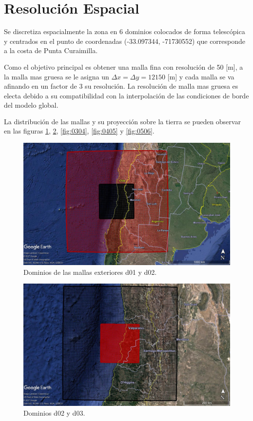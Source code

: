 \section{Resolución Espacial}
Se discretiza espacialmente la zona en 6 dominios colocados de forma telescópica y centrados en el punto de coordenadas (-33.097344, -71730552) que corresponde a la costa de Punta Curaimilla.

Como el objetivo principal es obtener una malla fina con resolución de 50 [m], a la malla mas gruesa se le asigna un $\Delta x = \Delta y = 12150$ [m] y cada malla se va afinando en un factor de 3 su resolución. La resolución de malla mas gruesa es electa debido a su compatibilidad con la interpolación de las condiciones de borde del modelo global.

La distribución de las mallas y su proyección sobre la tierra se pueden observar en las figuras \ref{fig:0102}, \ref{fig:0203}, \ref{fig:0304}, \ref{fig:0405} y \ref{fig:0506}.

\begin{figure}[H]
	\centering
	\includegraphics[width=0.95\linewidth]{Imagenes/d06d05}
	\caption{Dominios de las mallas exteriores d01 y d02.}
	\label{fig:0102}
\end{figure}

\begin{figure}[H]
	\centering
	\includegraphics[width=0.95\linewidth]{Imagenes/d05d04}
	\caption{Dominios d02 y d03.}
	\label{fig:0203}
\end{figure}

